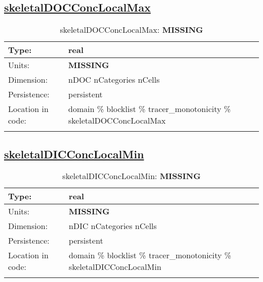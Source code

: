 \subsection[skeletalDOCConcLocalMax]{\hyperref[sec:var_tab_tracer_monotonicity]{skeletalDOCConcLocalMax}}
\label{subsec:var_sec_tracer_monotonicity_skeletalDOCConcLocalMax}
\begin{center}
\begin{longtable}{| p{2.0in} | p{4.0in} |}
        \hline 
        Type: & real \\
        \hline 
        Units: & {\bf \color{red} MISSING} \\
        \hline 
        Dimension: & nDOC nCategories nCells \\
        \hline 
        Persistence: & persistent \\
        \hline 
         Location in code: & domain \% blocklist \% tracer\_monotonicity \% skeletalDOCConcLocalMax \\
         \hline 
    \caption{skeletalDOCConcLocalMax: {\bf \color{red} MISSING}}
\end{longtable}
\end{center}
\subsection[skeletalDICConcLocalMin]{\hyperref[sec:var_tab_tracer_monotonicity]{skeletalDICConcLocalMin}}
\label{subsec:var_sec_tracer_monotonicity_skeletalDICConcLocalMin}
\begin{center}
\begin{longtable}{| p{2.0in} | p{4.0in} |}
        \hline 
        Type: & real \\
        \hline 
        Units: & {\bf \color{red} MISSING} \\
        \hline 
        Dimension: & nDIC nCategories nCells \\
        \hline 
        Persistence: & persistent \\
        \hline 
         Location in code: & domain \% blocklist \% tracer\_monotonicity \% skeletalDICConcLocalMin \\
         \hline 
    \caption{skeletalDICConcLocalMin: {\bf \color{red} MISSING}}
\end{longtable}
\end{center}
